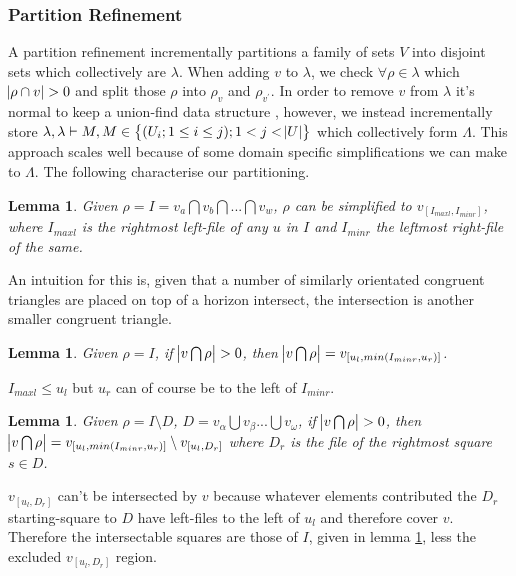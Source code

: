 \documentclass{amsart}
\newtheorem{lemma}[theorem]{Lemma}
\begin{document}
\subsubsection{Partition Refinement} A partition refinement \cite{refinement} incrementally partitions a family of sets $V$ into disjoint sets which collectively are $\lambda$. When adding $v$ to $\lambda$, we check $\forall \rho \in \lambda$ which $\abs{\rho \cap v} > 0$ and split those $\rho$ into $\rho_{v}$ and $\rho_{v^\prime}$. In order to remove $v$ from $\lambda$ it's normal to keep a union-find data structure \cite{unionFind}, however, we instead incrementally store $\lambda, \lambda \vdash M, M \in \set{(U_i ; 1 \leq i \leq j) ; 1 < j < \abs{U}}$ which collectively form $\Lambda$. This approach scales well because of some domain specific simplifications we can make to $\Lambda$. The following characterise our partitioning.

\begin{lemma}
	Given $\rho = I = v_a \bigcap v_b \bigcap ... \bigcap v_w$, $\rho$ can be simplified to $v_{[I_{maxl}, I_{minr}]}$, where $I_{maxl}$ is the rightmost left-file of any $u$ in $I$ and $I_{minr}$ the leftmost right-file of the same.
\end{lemma}

An intuition for this is, given that a number of similarly orientated congruent triangles are placed on top of a horizon intersect, the intersection is another smaller congruent triangle.

\begin{lemma} \label{onlyIntersection}
	 Given $\rho = I$, if $\abs{v \bigcap \rho} > 0$, then $\abs{v \bigcap \rho} = v_{[u_l, min(I_{minr}, u_r)]}$.
\end{lemma}

$I_{maxl} \leq u_l$ but $u_r$ can of course be to the left of $I_{minr}$.

\begin{lemma}
	Given $\rho = I \setminus D$, $D = v_\alpha \bigcup v_\beta ... \bigcup v_\omega$, if $\abs{v \bigcap \rho} > 0$, then $\abs{v \bigcap \rho} = v_{[u_l, min(I_{minr}, u_r)]} \setminus v_{[u_l, D_r]}$ where $D_r$ is the file of the rightmost square $s \in D$. 
\end{lemma}

$v_{[u_l, D_r]}$ can't be intersected by $v$ because whatever elements contributed the $D_r$ starting-square to $D$ have left-files to the left of $u_l$ and therefore cover $v$. Therefore the intersectable squares are those of $I$, given in lemma \ref{onlyIntersection}, less the excluded $v_{[u_l, D_r]}$ region.
\end{document}
